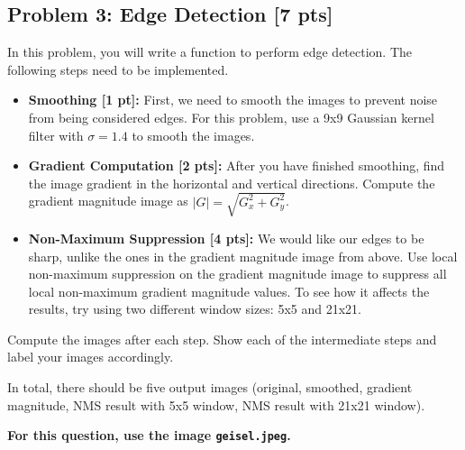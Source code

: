 \documentclass[11pt]{article}
\begin{document}
    \hypertarget{problem-3-edge-detection-7-pts}{%
\subsection{Problem 3: Edge Detection {[}7
pts{]}}\label{problem-3-edge-detection-7-pts}}

In this problem, you will write a function to perform edge detection.
The following steps need to be implemented.

\begin{itemize}
\item
  \textbf{Smoothing {[}1 pt{]}:} First, we need to smooth the images to
  prevent noise from being considered edges. For this problem, use a 9x9
  Gaussian kernel filter with \(\sigma = 1.4\) to smooth the images.
\item
  \textbf{Gradient Computation {[}2 pts{]}:} After you have finished
  smoothing, find the image gradient in the horizontal and vertical
  directions. Compute the gradient magnitude image as
  \(|G| = \sqrt{G_x^2 + G_y^2}\).
\item
  \textbf{Non-Maximum Suppression {[}4 pts{]}:} We would like our edges
  to be sharp, unlike the ones in the gradient magnitude image from
  above. Use local non-maximum suppression on the gradient magnitude
  image to suppress all local non-maximum gradient magnitude values. To
  see how it affects the results, try using two different window sizes:
  5x5 and 21x21.
\end{itemize}

Compute the images after each step. Show each of the intermediate steps
and label your images accordingly.

In total, there should be five output images (original, smoothed,
gradient magnitude, NMS result with 5x5 window, NMS result with 21x21
window).

\textbf{For this question, use the image \texttt{geisel.jpeg}.}
\end{document}
